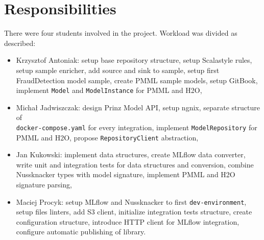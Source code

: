 \chapter{Responsibilities}
\label{chap:responsibilities}

There were four students involved in the project.
Workload was divided as described:

\begin{itemize}
    \item Krzysztof Antoniak: setup base repository structure, setup Scalastyle rules, setup sample enricher, add source and sink to sample,
    setup first FraudDetection model sample, create PMML sample models, setup GitBook, implement \texttt{Model} and \texttt{ModelInstance} for PMML and H2O,
    \item Michał Jadwiszczak: design Prinz Model API, setup ngnix, separate structure of  \\ \texttt{docker-compose.yaml} for every integration,
    implement \texttt{ModelRepository} for PMML and H2O, propose \texttt{RepositoryClient} abstraction,
    \item Jan Kukowski: implement data structures, create MLflow data converter, write unit and integration tests
    for data structures and conversion, combine Nussknacker types with model signature, implement PMML and H2O signature parsing,
    \item Maciej Procyk: setup MLflow and Nussknacker to first \texttt{dev-environment}, setup files linters,
    add S3 client, initialize integration tests structure, create configuration structure, introduce HTTP client for MLflow integration,
    configure automatic publishing of library.
\end{itemize}
